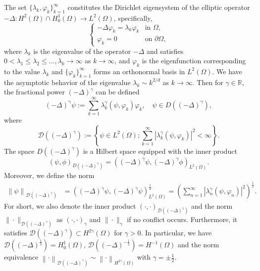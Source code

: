 \documentclass[11pt]{article}
\numberwithin{equation}{section}
\begin{document}
The set $\{\lambda_k, \varphi_k\}_{k=1}^{\infty}$ constitutes the Dirichlet eigensystem of the elliptic operator $-\Delta: H^2(\Omega) \cap H_0^1(\Omega) \to L^2(\Omega)$, specifically,
\begin{equation*}%
\begin{cases}
-\Delta \varphi_k = \lambda_k \varphi_k & \text{in } \Omega, \\
\varphi_k =0 & \text{on } \partial \Omega,
\end{cases}
\end{equation*}
where $\lambda_k$ is the eigenvalue of the operator $-\Delta$ and satisfies $0 < \lambda_1 \leq \lambda_2 \leq \ldots , \lambda_k \rightarrow \infty$ as $k \rightarrow \infty$, and $\varphi_k$ is the eigenfunction corresponding to the value $\lambda_k$ and $\{\varphi_k\}_{k=1}^\infty$ forms an orthonormal basis in $L^2(\Omega)$. We have the asymptotic behavior of the eigenvalue $\lambda_k\sim k^{2/d}$ as $k\to\infty$. Then for $\gamma\in\mathbb R$, the fractional power $(-\Delta )^{\gamma}$ can be defined
\begin{equation}\label{frac-power-define}
  (-\Delta )^{\gamma}\psi:=\sum_{k=1}^{\infty}\lambda_k^{\gamma}(\psi, \varphi _k)\varphi _k,\quad \psi \in D((-\Delta)^\gamma),
\end{equation}
where
$$\mathcal{D}((-\Delta )^{\gamma}):=\left \{ \psi\in L^{2}(\Omega); \sum_{k=1}^{\infty}\left |\lambda_k^{\gamma}(\psi, \varphi _k ) \right |^2<\infty  \right \}.
$$
The space $D((-\Delta)^\gamma)$ is a Hilbert space equipped with the inner product
\begin{equation*}
( \psi, \phi)_{D((-\Delta)^\gamma)}  = \left ((-\Delta)^\gamma \psi, (-\Delta)^\gamma\phi \right )_{L^2(\Omega)}.
\end{equation*}
Moreover, we define the norm
$$
\begin{aligned}
\left \| \psi  \right \|_{\mathcal{D}((-\Delta )^\gamma) }
&= \left ((-\Delta)^\gamma \psi, (-\Delta)^\gamma\psi \right )_{L^2(\Omega)}^{\frac12}
= \left ( \sum_{n=1}^{\infty}\left |\lambda_n^{\gamma}(\psi, \varphi_n )  \right |^2 \right )^\frac{1}{2}.
\end{aligned}
$$
For short, we also denote the inner product $(\cdot,\cdot)_{\mathcal D((-\Delta)^\gamma)}$ and the norm $\|\cdot\|_{\mathcal D((-\Delta)^\gamma)}$ as $(\cdot,\cdot)_\gamma$ and $\|\cdot\|_\gamma$ if no conflict occurs. Furthermore, it satisfies $\mathcal{D}((-\Delta )^\gamma)\subset{H^{2\gamma}(\Omega)}$ for $\gamma>0$. In particular, we have $\mathcal{D}((-\Delta )^\frac{1}{2}) = H_0^1(\Omega)$, $\mathcal{D}((-\Delta )^{-\frac{1}{2}}) = H^{-1}(\Omega)$ and the norm equivalence $\left \| \cdot   \right \| _{\mathcal{D}((-\Delta )^\gamma  ) }\sim \left \| \cdot  \right \| _{H^{2\gamma}(\Omega)}$ with $\gamma=\pm \frac12$.
\end{document}
